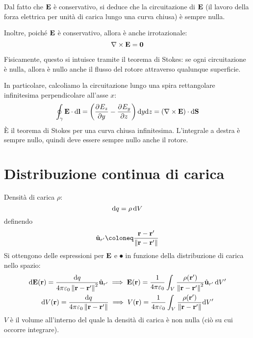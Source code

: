 Dal fatto che $\mathbf{E}$ è conservativo, si deduce che la circuitazione di $\mathbf{E}$ (il lavoro della forza elettrica per unità di carica lungo una curva chiusa) è sempre nulla.

Inoltre, poiché $\mathbf{E}$ è conservativo, allora è anche irrotazionale:
\begin{equation}
    \nabla \times \mathbf{E} = \mathbf{0}
\end{equation}

Fisicamente, questo si intuisce tramite il teorema di Stokes: se ogni circuitazione è nulla, allora è nullo anche il flusso del rotore attraverso qualunque superficie.

In particolare, calcoliamo la circuitazione lungo una spira rettangolare infinitesima perpendicolare all'asse $x$:
\begin{equation}
    \oint_\gamma \E \lde = \pts{\parder[E_z]{y} - \parder[E_y]{z}} \de y \de z = \pts{\curl \E} \sde
\end{equation}
È il teorema di Stokes per una curva chiusa infinitesima.
L'integrale a destra è sempre nullo, quindi deve essere sempre nullo anche il rotore.




\section{Distribuzione continua di carica}

Densità di carica $\rho$:
\begin{equation}
    \mathrm{d} q = \rho \, \mathrm{d} V
\end{equation}
definendo
\begin{equation}
    \ver{r'} \coloneq \frac{\p - \p'}{\norm{\p - \p'}}
\end{equation}
Si ottengono delle espressioni per $\mathbf{E}$ e $\spot$ in funzione della distribuzione di carica nello spazio:
\begin{gather}
    \mathrm{d} \mathbf{E}(\mathbf{r}) = \frac{\mathrm{d} q}{4\pi \varepsilon_0 \left\lVert \mathbf{r} - \mathbf{r}' \right\rVert^2} \hat{\mathbf{u}}_{r'}
    \implies
    \mathbf{E}(\mathbf{r}) = \frac{1}{4\pi \varepsilon_0} \int_V \frac{\rho(\mathbf{r}')}{\left\lVert \mathbf{r} - \mathbf{r}' \right\rVert^2} \hat{\mathbf{u}}_{r'} \, \mathrm{d} V' \\
    \mathrm{d} V(\mathbf{r}) = \frac{\mathrm{d} q}{4\pi \varepsilon_0 \left\lVert \mathbf{r} - \mathbf{r}' \right\rVert}
    \implies
    V(\mathbf{r}) = \frac{1}{4\pi \varepsilon_0} \int_V \frac{\rho(\mathbf{r}')}{\left\lVert \mathbf{r} - \mathbf{r}' \right\rVert} \mathrm{d} V'
\end{gather}
$V$ è il volume all'interno del quale la densità di carica è non nulla (ciò su cui occorre integrare).

